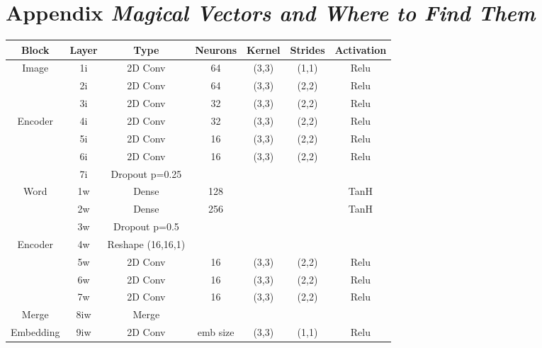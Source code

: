 \chapter{Appendix \emph{Magical Vectors and Where to Find Them}}
\label{appendix:app5}


\begin{table}
		\centering
		\begin{tabular}{|c|c|c|c|c|c|c|}
			\hline
			\textbf{Block} & \textbf{Layer} & \textbf{Type} & \textbf{Neurons} & \textbf{Kernel} & \textbf{Strides} & \textbf{Activation} \\ \hline
			\multirow{3}{*}{Image} & 1i	&	2D Conv & 64 & (3,3) & (1,1) & Relu \\ \cline{2-7}
			& 2i	&	2D Conv & 64 & (3,3) & (2,2) & Relu \\ \cline{2-7}
			& 3i	&	2D Conv & 32 & (3,3) & (2,2) & Relu \\ \cline{2-7}
\multirow{3}{*}{Encoder} & 4i	&	2D Conv & 32 & (3,3) & (2,2) & Relu \\ \cline{2-7}
			& 5i	&	2D Conv & 16 & (3,3) & (2,2) & Relu \\ \cline{2-7}
			& 6i	&	2D Conv & 16 & (3,3) & (2,2) & Relu \\ \cline{2-7}
			& 7i	&	Dropout p=0.25 &	 & 	     &       &  \\ \hline

			\multirow{3}{*}{Word} & 1w	& Dense & 128 & & &TanH \\ \cline{2-7}
			& 2w	& Dense & 256 & & &TanH \\ \cline{2-7}
			& 3w 	&	Dropout p=0.5 &	 & 	     &       & \\ \cline{2-7}
\multirow{4}{*}{Encoder}& 4w  &	Reshape (16,16,1) & & & & \\ \cline{2-7}
			& 5w	&	2D Conv & 16 & (3,3) & (2,2) & Relu \\ \cline{2-7}
			& 6w	&	2D Conv & 16 & (3,3) & (2,2) & Relu \\ \cline{2-7}
			& 7w	&	2D Conv & 16 & (3,3) & (2,2) & Relu \\ \hline

			Merge & 8iw	& Merge & & & & \\ \hline
Embedding & 9iw	&	2D Conv  & emb size & (3,3) & (1,1) & Relu \\ \hline
			

\end{tabular}
\end{table}
